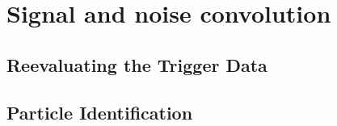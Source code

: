 \documentclass[12pt,a4paper]{article}
\newenvironment{Figure}
  {\par\medskip\noindent\minipage{\linewidth}}
  {\endminipage\par\medskip}
\begin{document}

\section{Signal and noise convolution}
\subsection{Reevaluating the Trigger Data}
\subsection{Particle Identification}
\end{document}
